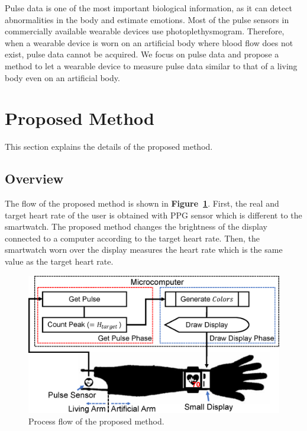 \documentclass[sigchi,authordraft]{acmart}
\newcommand\figref[1]{\textbf{Figure~\ref{fig:#1}}}
\begin{document}
Pulse data is one of the most important biological information, as it can detect abnormalities in the body and estimate emotions. Most of the pulse sensors in commercially available wearable devices use photoplethysmogram. Therefore, when a wearable device is worn on an artificial body where blood flow does not exist, pulse data cannot be acquired. We focus on pulse data and propose a method to let a wearable device to measure pulse data similar to that of a living body even on an artificial body.

\section{Proposed Method}
\label{sec:method}
This section explains the details of the proposed method.

\subsection{Overview}
\label{subsec:overview}
The flow of the proposed method is shown in \figref{method}. First, the real and target heart rate of the user is obtained with PPG sensor which is different to the smartwatch. The proposed method changes the brightness of the display connected to a computer according to the target heart rate. Then, the smartwatch worn over the display measures the heart rate which is the same value as the target heart rate.\par

\begin{figure}[!t]
  \centering
  \includegraphics[width=1\linewidth]{figures/method.eps}
  \caption{Process flow of the proposed method.}
  \label{fig:method}
\end{figure}
\end{document}
